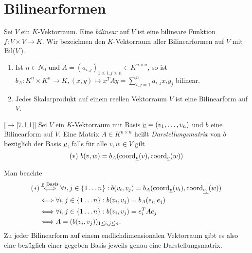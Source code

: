 \documentclass[../../main.tex]{subfiles}
\begin{document}
\section{Bilinearformen}

\begin{df}\label{13.3.1}
Sei $V$ ein $K$-Vektorraum. Eine \emph{bilinear} auf $V$ ist eine bilineare Funktion $f: V\times V\to K$. Wir bezeichnen den $K$-Vektorraum aller Bilinearformen auf $V$ mit $\operatorname{Bil}(V)$.
\end{df}

\begin{bsp}\label{13.3.2}
\begin{enumerate}[\normalfont(a)]
\item Ist $n\in N_0$ und $A=(a_{i,j})_{1\le i,j\le n}\in K^{n\times n}$, so ist $b_A: K^n\times K^n\to K, (x,y)\mapsto x^TAy=\sum_{i,j=1}^na_{i,j}x_iy_j$ bilinear.
\item Jedes Skalarprodukt auf einem reellen Vektorraum $V$ ist eine Bilinearform auf $V$.
\end{enumerate}
\end{bsp}
	
\begin{df}\label{13.3.3} 
[$\to$\ref{7.1.1}] Sei $V$ ein $K$-Vektorraum mit Basis ${\underline v}=(v_1,\ldots ,v_n)$ und $b$ eine Bilinearform auf $V$. Eine Matrix $A\in K^{n\times n}$ heißt \emph{Darstellungsmatrix} von $b$ bezüglich der Basis ${\underline v}$, falls für alle $v,w\in V$ gilt
\begin{align*}
(*)\ b(v,w)=b_A(\operatorname{coord}_{{\underline v}}(v),\operatorname{coord}_{{\underline v}}(w))
\end{align*}
\end{df}

\begin{bem}\label{13.3.4} 
Man beachte
\begin{align*}
(*)&\stackrel{\underline{v}\text{ Basis}}{\Longleftrightarrow} \forall i,j\in \{1\ldots n\}: b(v_i,v_j)=b_A(\operatorname{coord}_{\underline{v}}(v_i),\operatorname{coord}_{\underline{v_j}}(w))\\
&\Longleftrightarrow \forall i,j\in \{1\ldots n\}: b(v_i,v_j)=b_A(e_i,e_j)\\
&\Longleftrightarrow \forall i,j\in \{1\ldots n\}: b(v_i,v_j)=e_i^TAe_j\\
&\Longleftrightarrow A=(b(v_i,v_j))_{1\le i,j\le n}.
\end{align*}
Zu jeder Bilinearform auf einem endlichdimensionalen Vektorraum gibt es also eine bezüglich einer gegeben Basis jeweils genau eine Darstellungsmatrix.
\end{bem}
	
\end{document}
